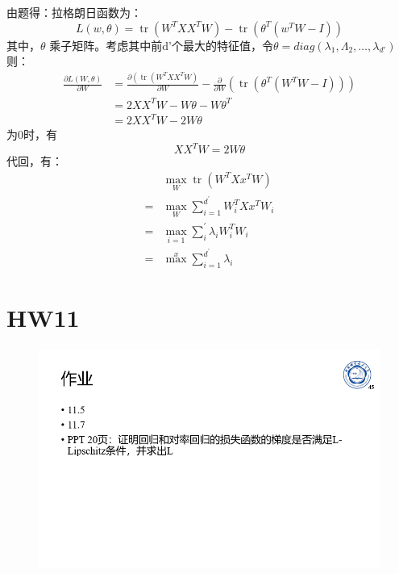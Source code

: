 \documentclass[UTF8,a4paper,AutoFakeBold,AutoFakeSlant]{article}
\begin{document}
由题得：拉格朗日函数为：
$$ L(w, \theta)=\operatorname{tr}\left(W^{T} X X^{T} W\right)-\operatorname{tr}\left(\theta^{T}\left(w^{T} W-I\right)\right) $$
其中，$\theta$ 乘子矩阵。考虑其中前d'个最大的特征值，令$ \theta = diag(\lambda_1,\Lambda_2,\dots,\lambda_{d'}) $
则：
\begin{equation*}
  \begin{aligned}
    \frac{\partial L (W, \theta)}{\partial W} & =\frac{\partial\left(\operatorname{tr}\left(W^{T} X X^{T} W\right)\right.}{\partial W}-\frac{\partial}{\partial W}\left(\operatorname{tr}\left(\theta^{T}\left(W^{T} W-I\right)\right)\right) \\
                                              & =2 X X^{T} W-W \theta-W \theta^{T}                                                                                                                                                            \\
                                              & =2 X X^{T} W-2 W \theta
  \end{aligned}
\end{equation*}
为0时，有
$$ X X^{T} W = 2 W \theta $$
代回，有：
\begin{equation*}
  \begin{aligned}
      & \max _{W} \operatorname{tr}\left(W^{T} X x^{T} W\right)   \\
    = & \max _{W} \sum_{i=1}^{d^{\prime}} W_{i}^{T} X x^{T} W_{i} \\
    = & \max _{i=1} \sum_{i}^{\prime} \lambda_{i} W_{i}^{T} W_{i} \\
    = & \max ^{x} \sum_{i=1}^{d^{\prime}} \lambda_{i}
  \end{aligned}
\end{equation*}




\section{HW11}

\begin{figure}[H]
  \centering
  \includegraphics[scale=0.375]{hw11.png}
  \label{f11}
\end{figure}
\end{document}
